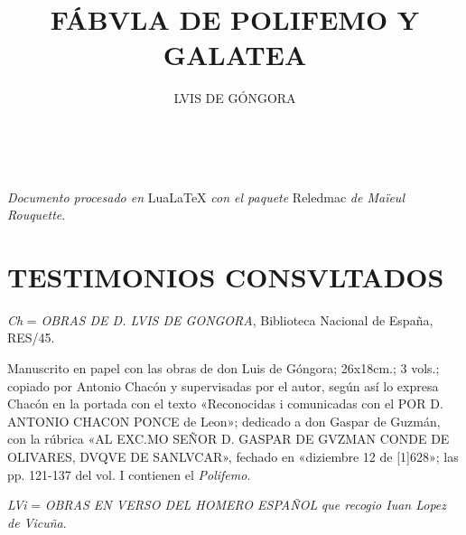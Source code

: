 \documentclass[11pt,a4paper,twoside]{article}
\title{FÁBVLA DE POLIFEMO Y GALATEA}
\author{\fontsize{14}{11.96}\selectfont LVIS DE GÓNGORA}
\date{\vspace{60pt}\fontsize{11}{11}\selectfont{TEXTO Y VARIANTES DE LA REDACCIÓN PRIMITIVA}\\\fontsize{40}{11}\selectfont{\vfill\LaTeX}}
\begin{document}
	{
			\maketitle
		}
		\newpage%

\null
\vfill
	\begin{flushright}
	\textit{Documento procesado en} LuaLaTeX \textit{con el paquete} Reledmac \textit{de Maïeul Rouquette}.
	\end{flushright}
\newpage

\tableofcontents
\newpage

\setcounter{page}{1}
\section*{\fontsize{13}{14.35}\selectfont TESTIMONIOS CONSVLTADOS}

\textit{Ch} = \textit{\fontsize{9}{11}\selectfont OBRAS DE D. LVIS DE GONGORA}, Biblioteca Nacional de España, RES/45. 

Manuscrito en papel con las obras de don Luis de Góngora; 26x18cm.; 3 vols.; copiado por Antonio Chacón y supervisadas por el autor, según así lo expresa Chacón en la portada con el texto «Reconocidas i comunicadas con el {\fontsize{9}{11}\selectfont POR D. ANTONIO CHACON PONCE} de Leon»; dedicado a don Gaspar de Guzmán, con la rúbrica «{\fontsize{9}{11}\selectfont AL EXC.MO SEÑOR D. GASPAR DE GVZMAN CONDE DE OLIVARES, DVQVE DE SANLVCAR}», fechado en «diziembre 12 de [1]628»; las pp. 121-137 del vol. I contienen el \textit{Polifemo}.\vspace{5pt}

\textit{LVi} = \textit{\fontsize{9}{11}\selectfont \textit{OBRAS EN VERSO DEL HOMERO ESPAÑOL}} \textit{que recogio Iuan Lopez de Vicuña}.
\end{document}
